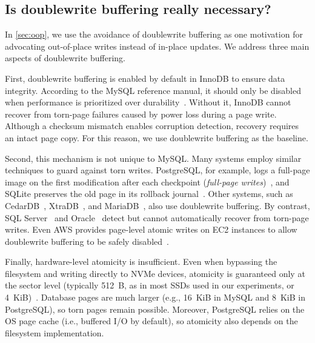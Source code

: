 \subsection{Is doublewrite buffering really necessary?}\label{sec:q6}
In \cref{sec:oop}, we use the avoidance of doublewrite buffering as one motivation for advocating out-of-place writes instead of in-place updates.
We address three main aspects of doublewrite buffering.

First, doublewrite buffering is enabled by default in InnoDB to ensure data integrity.
According to the MySQL reference manual, it should only be disabled when performance is prioritized over durability~\cite{mysql-dwb}.
Without it, InnoDB cannot recover from torn-page failures caused by power loss during a page write.
Although a checksum mismatch enables corruption detection, recovery requires an intact page copy.
For this reason, we use doublewrite buffering as the baseline.

Second, this mechanism is not unique to MySQL.
Many systems employ similar techniques to guard against torn writes.
PostgreSQL, for example, logs a full-page image on the first modification after each checkpoint (\emph{full-page writes})~\cite{postgresql/doc/dwb},
and SQLite preserves the old page in its rollback journal~\cite{sqlite-journal}.
Other systems, such as CedarDB~\cite{cedardb-dwb}, XtraDB~\cite{xtradb-dwb}, and MariaDB~\cite{mariadb-dwb}, also use doublewrite buffering.
By contrast, SQL Server~\cite{sqlserver-pageverify} and Oracle~\cite{oracle-block-checksum} detect but cannot automatically recover from torn-page writes.
Even AWS provides page-level atomic writes on EC2 instances to allow doublewrite buffering to be safely disabled~\cite{aws-dwb}.

Finally, hardware-level atomicity is insufficient.
Even when bypassing the filesystem and writing directly to NVMe devices,
atomicity is guaranteed only at the sector level (typically 512~B, as in most SSDs used in our experiments, or 4~KiB)~\cite{nvmexpress-spec-1.1}.
Database pages are much larger (e.g., 16~KiB in MySQL and 8~KiB in PostgreSQL),
so torn pages remain possible.
Moreover, PostgreSQL relies on the OS page cache (i.e., buffered I/O by default), so atomicity also depends on the filesystem implementation.

